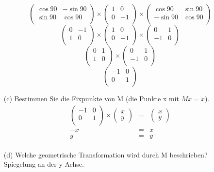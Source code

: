 \documentclass[11pt]{article}
\begin{document}
\begin{enumerate}
$$$$
$$ 
\begin{pmatrix}
\cos 90 & -\sin 90 \\
\sin 90 & \cos 90 \\
\end{pmatrix}
\times
\begin{pmatrix}
1 & 0 \\
0 & -1 \\
\end{pmatrix}
\times
\begin{pmatrix}
\cos 90 & \sin 90 \\
-\sin 90 & \cos 90 \\
\end{pmatrix}
$$
$$ 
\begin{pmatrix}
0 & -1 \\
1 & 0 \\
\end{pmatrix}
\times
\begin{pmatrix}
1 & 0 \\
0 & -1 \\
\end{pmatrix}
\times
\begin{pmatrix}
0 & 1 \\
-1 & 0 \\
\end{pmatrix}
$$
$$
\begin{pmatrix}
0 & 1 \\
1 & 0 \\
\end{pmatrix}
\times
\begin{pmatrix}
0 & 1 \\
-1 & 0 \\
\end{pmatrix}
$$
$$
\begin{pmatrix}
-1 & 0 \\
0 & 1 \\
\end{pmatrix}
$$

\item[(c)] Bestimmen Sie die Fixpunkte von M (die Punkte x mit $M x = x$).
\begin{eqnarray*}
\begin{pmatrix}
-1 & 0 \\
0 & 1 \\
\end{pmatrix} 
\times
\begin{pmatrix}
x \\ y
\end{pmatrix}
&=& 
\begin{pmatrix}
x \\ y
\end{pmatrix}
\\
-x &=& x \\
y &=& y \\
\end{eqnarray*}
\item[(d)] Welche geometrische Transformation wird durch M beschrieben?\\
Spiegelung an der y-Achse.
\end{enumerate}
\end{document}
